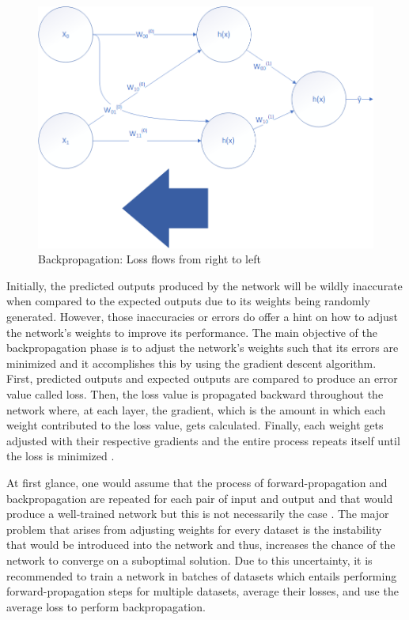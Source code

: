 \documentclass[conference]{IEEEtran}
\begin{document}
        \begin{figure}[!htb]
            \centering
            \captionsetup{justification=centering}
            \includegraphics[width=\linewidth]{BackwardProp.png}
            \caption{Backpropagation: Loss flows from right to left}  
        \end{figure}

        Initially, the predicted outputs produced by the network will be wildly inaccurate when compared to the expected outputs due to its weights being randomly generated. However, those inaccuracies or errors do offer a hint on how to adjust the network’s weights to improve its performance. The main objective of the backpropagation phase is to adjust the network’s weights such that its errors are minimized and it accomplishes this by using the gradient descent algorithm. First, predicted outputs and expected outputs are compared to produce an error value called loss. Then, the loss value is propagated backward throughout the network where, at each layer, the gradient, which is the amount in which each weight contributed to the loss value, gets calculated. Finally, each weight gets adjusted with their respective gradients and the entire process repeats itself until the loss is minimized \cite{kostadinov_2019}.

        At first glance, one would assume that the process of forward-propagation and backpropagation are repeated for each pair of input and output and that would produce a well-trained network but this is not necessarily the case \cite{ruder2017overview}. The major problem that arises from adjusting weights for every dataset is the instability that would be introduced into the network and thus, increases the chance of the network to converge on a suboptimal solution. Due to this uncertainty, it is recommended to train a network in batches of datasets which entails performing forward-propagation steps for multiple datasets, average their losses, and use the average loss to perform backpropagation. 
\end{document}
